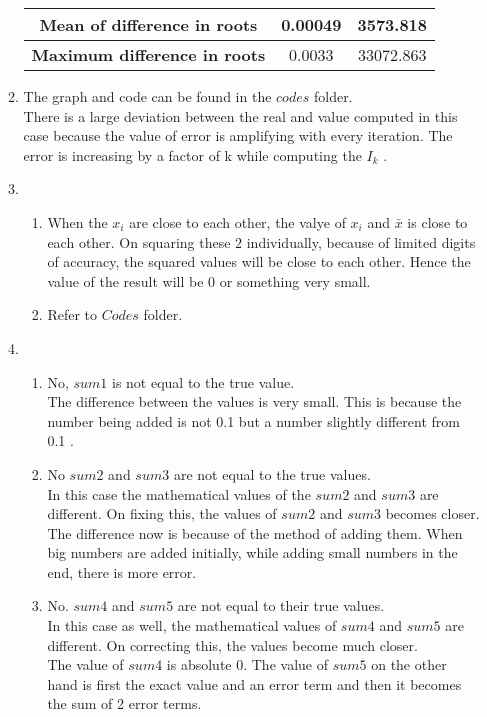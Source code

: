 \documentclass[11pt]{article}
\begin{document}
\begin{enumerate}
\begin{enumerate}
\begin{table}[!htb]
\begin{tabular}{|c|c|c|}
				\textbf{Mean of difference in roots}          & 0.00049                        & 3573.818  \\ \hline
				\textbf{Maximum difference in roots} & 0.0033                         & 33072.863 \\ \hline
				\end{tabular}
				\end{table}
			\item %
					The graph and code can be found in the $codes$ folder. \\
					There is a large deviation between the real and value computed in this case because the value of error is amplifying with every iteration. The error is increasing by a factor of k while computing the $I_k$ .
			\item %
				\begin{enumerate}
					\item When the $x_i$ are close to each other, the valye of $x_i$ and $\bar{x}$ is close to each other. On squaring these $2$ individually, because of limited digits of accuracy, the squared values will be close to each other.
						 Hence the value of the result will be 0 or something very small.
					\item Refer to $Codes$ folder. 
				\end{enumerate}
			\item %
				\begin{enumerate}
					\item No, $sum1$ is not equal to the true value. \\
							The difference between the values is very small. This is because the number being added is not 0.1 but a number slightly different from 0.1 .
					\item No $sum2$ and $sum3$ are not equal to the true values. \\
							In this case the mathematical values of the $sum2$ and $sum3$ are different. On fixing this, the values of $sum2$ and $sum3$ becomes closer. The difference now is because of the method of adding them.
							When big numbers are added initially, while adding small numbers in the end, there is more error.
					\item No. $sum4$ and $sum5$ are not equal to their true values. \\
							In this case as well, the mathematical values of $sum4$ and $sum5$ are different. On correcting this, the values become much closer. \\
							The value of $sum4$ is absolute 0. The value of $sum5$ on the other hand is first the exact value and an error term and then it becomes the sum of 2 error terms.

\end{enumerate}
\end{enumerate}
\end{enumerate}
\end{document}
